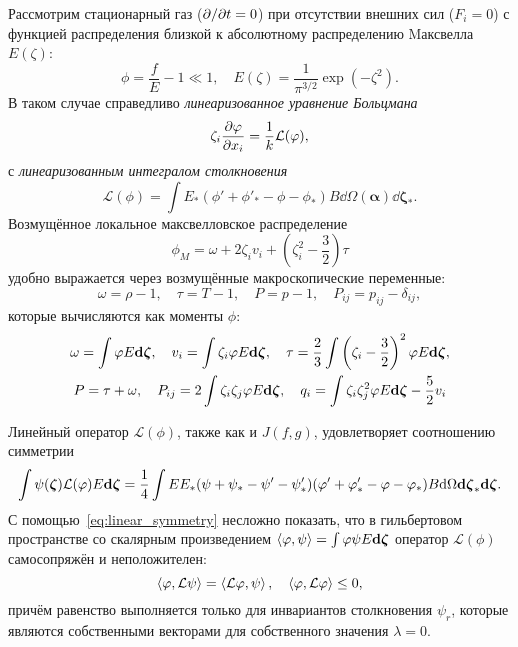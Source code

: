 Рассмотрим стационарный газ (\(\Pder{t}=0\)) при отсутствии внешних сил (\(F_i=0\))
с функцией распределения близкой к абсолютному распределению Mаксвелла \(E(\zeta)\):
\begin{equation}\label{eq:linear_condition}
    \phi = \frac{f}{E} - 1 \ll 1, \quad E(\zeta) = \frac1{\pi^{3/2}}\exp\left(-\zeta^2\right).
\end{equation}
В таком случае справедливо \emph{линеаризованное уравнение Больцмана}
\begin{equation}\label{eq:linear_Boltzmann}
    \zeta_i \pder[\phi]{x_i} = \frac1k \mathcal{L}(\phi),
\end{equation}
с \emph{линеаризованным интегралом столкновения}
\begin{equation}\label{eq:linear_ci}
    \mathcal{L}(\phi) = \int E_*(\phi'+\phi'_*-\phi-\phi_*) B
    \dd \Omega(\boldsymbol{\alpha}) \boldsymbol{\dd \zeta_*}.
\end{equation}
Возмущённое локальное максвелловское распределение
\begin{equation}\label{eq:linear_maxwellian}
    \phi_M = \omega + 2\zeta_i v_i + \left(\zeta_i^2-\frac32\right)\tau
\end{equation}
удобно выражается через возмущённые макроскопические переменные:
\begin{equation}\label{eq:linear_macro}
    \omega = \rho-1, \quad \tau = T-1, \quad P = p-1, \quad P_{ij} = p_{ij} - \delta_{ij},
\end{equation}
которые вычисляются как моменты \(\phi\):
\begin{gather}\label{eq:linear_macro_variables}
    \begin{gathered}
        \omega = \int \phi E\dzeta, \quad
        v_i = \int \zeta_i \phi E\dzeta, \quad
        \tau = \frac23 \int \left( \zeta_i-\frac32 \right)^2 \phi E\dzeta, \\
        P = \tau + \omega, \quad
        P_{ij} = 2\int \zeta_i\zeta_j\phi E\dzeta, \quad
        q_i = \int \zeta_i\zeta_j^2\phi E\dzeta - \frac52v_i
    \end{gathered}
\end{gather}

Линейный оператор \(\mathcal{L}(\phi)\), также как и \(J(f,g)\), удовлетворяет соотношению симметрии
\begin{equation}\label{eq:linear_symmetry}
    \int\psi(\bzeta)\mathcal{L}(\phi)E\dzeta = \frac14\int EE_* (\psi+\psi_*-\psi'-\psi'_*)
        (\phi'+\phi'_*-\phi-\phi_*) B\dd\Omega\dzeta_*\dzeta.
\end{equation}
С помощью~\eqref{eq:linear_symmetry} несложно показать, что в гильбертовом пространстве
со скалярным произведением \( \inner{\phi}{\psi} = \int\phi\psi E\dzeta\)
оператор \(\mathcal{L}(\phi)\) самосопряжён и неположителен:
\begin{equation}\label{eq:linear_properties}
    \inner{\phi}{\mathcal{L}\psi} = \inner{\mathcal{L}\phi}{\psi}, \quad
    \inner{\phi}{\mathcal{L}\phi} \leq 0,
\end{equation}
причём равенство выполняется только для инвариантов столкновения \(\psi_r\),
которые являются собственными векторами для собственного значения \(\lambda = 0\).

